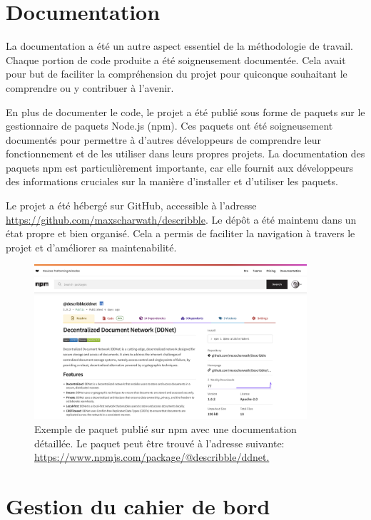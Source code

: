\section{Documentation}

La documentation a été un autre aspect essentiel de la méthodologie de travail. Chaque portion de code produite a été soigneusement documentée. Cela avait pour but de faciliter la compréhension du projet pour quiconque souhaitant le comprendre ou y contribuer à l'avenir.

En plus de documenter le code, le projet a été publié sous forme de paquets sur le gestionnaire de paquets \gls{Node.js} (\gls{npm}). Ces paquets ont été soigneusement documentés pour permettre à d'autres développeurs de comprendre leur fonctionnement et de les utiliser dans leurs propres projets. La documentation des paquets \gls{npm} est particulièrement importante, car elle fournit aux développeurs des informations cruciales sur la manière d'installer et d'utiliser les paquets.

Le projet a été hébergé sur GitHub, accessible à l'adresse \url{https://github.com/maxscharwath/describble}. Le dépôt a été maintenu dans un état propre et bien organisé. Cela a permis de faciliter la navigation à travers le projet et d'améliorer sa maintenabilité.

\begin{figure}[H]
    \centering
    \includegraphics[width=0.9\textwidth]{assets/figures/npm-package.png}
    \caption{Exemple de paquet publié sur \gls{npm} avec une documentation détaillée. Le paquet peut être trouvé à l'adresse suivante: \url{https://www.npmjs.com/package/@describble/ddnet.}}
\end{figure}

\section{Gestion du cahier de bord}

